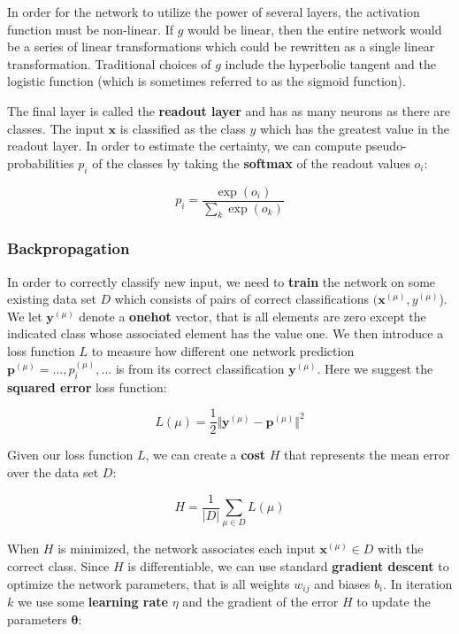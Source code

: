 In order for the network to utilize the power of several layers, the activation function must be non-linear. If $g$ would be linear, then the entire network would be a series of linear transformations which could be rewritten as a single linear transformation. Traditional choices of $g$ include the hyperbolic tangent and the logistic function (which is sometimes referred to as the sigmoid function).

The final layer is called the \textbf{readout layer} and has as many neurons as there are classes. The input $\mathbf{x}$ is classified as the class $y$ which has the greatest value in the readout layer. In order to estimate the certainty, we can compute pseudo-probabilities $p_i$ of the classes by taking the \textbf{softmax} of the readout values $o_i$:

\[
p_i = \frac{ \exp(o_i) }{ \sum_k \exp(o_k) }
\]

\subsubsection{Backpropagation} \label{sssec:BackProp}

In order to correctly classify new input, we need to \textbf{train} the network on some existing data set $D$ which consists of pairs of correct classifications $(\mathbf{x}^{(\mu)}, y^{(\mu)}$).
We let $\mathbf{y}^{(\mu)}$ denote a \textbf{onehot} vector, that is all elements are zero except the indicated class whose associated element has the value one.
We then introduce a loss function $L$ to measure how different one network prediction $\mathbf{p}^{(\mu)}={\ldots, p_i^{(\mu)}, \ldots}$ is from its correct classification $\mathbf{y}^{(\mu)}$. Here we suggest the \textbf{squared error} loss function:

\[
L(\mu) = \frac{1}{2} \Vert
  \mathbf{y}^{(\mu)} - \mathbf{p}^{(\mu)}
\Vert ^2
\]

Given our loss function $L$, we can create a \textbf{cost} $H$ that represents the mean error over the data set $D$:

\[
H = \frac{1}{\vert D \vert} \sum_{\mu \in D} L(\mu)
\]

When $H$ is minimized, the network associates each input $\mathbf{x}^{(\mu)} \in D$ with the correct class. Since $H$ is differentiable, we can use standard \textbf{gradient descent} to optimize the network parameters, that is all weights $w_{ij}$ and biases $b_i$.
In iteration $k$ we use some \textbf{learning rate} $\eta$ and the gradient of the error $H$ to update the parameters $\mathbf{\theta}$:

